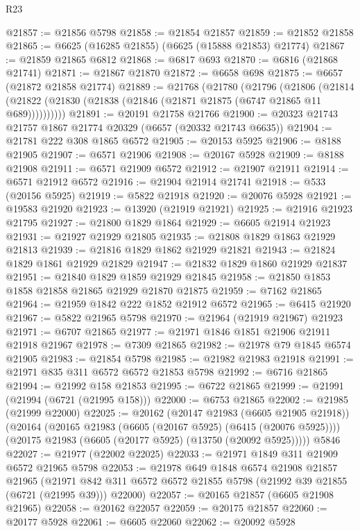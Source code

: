\begin{lexlean}{R23}
\begin{coremodule}
@21857 := @21856 @5798
@21858 := @21854 @21857
@21859 := @21852 @21858
@21865 := @6625 (@16285 @21855) (@6625 (@15888 @21853) @21774)
@21867 := @21859 @21865 @6812
@21868 := @6817 @693
@21870 := @6816 (@21868 @21741)
@21871 := @21867 @21870
@21872 := @6658 @698
@21875 := @6657 (@21872 @21858 @21774)
@21889 := @21768
    (@21780
      (@21796
        (@21806
          (@21814 (@21822 (@21830 (@21838 (@21846 (@21871 @21875 (@6747 @21865 @11 @689))))))))))
@21891 := @20191 @21758 @21766
@21900 := @20323 @21743 @21757 @1867 @21774 @20329 (@6657 (@20332 @21743 @6635))
@21904 := @21781 @222 @308 @1865 @6572
@21905 := @20153 @5925
@21906 := @8188 @21905
@21907 := @6571 @21906
@21908 := @20167 @5928
@21909 := @8188 @21908
@21911 := @6571 @21909 @6572
@21912 := @21907 @21911
@21914 := @6571 @21912 @6572
@21916 := @21904 @21914 @21741
@21918 := @533 (@20156 @5925)
@21919 := @5822 @21918
@21920 := @20076 @5928
@21921 := @19583 @21920
@21923 := @13920 (@21919 @21921)
@21925 := @21916 @21923 @21795
@21927 := @21800 @1829 @1864
@21929 := @6605 @21914 @21923
@21931 := @21927 @21929 @21805
@21935 := @21808 @1829 @1863 @21929 @21813
@21939 := @21816 @1829 @1862 @21929 @21821
@21943 := @21824 @1829 @1861 @21929 @21829
@21947 := @21832 @1829 @1860 @21929 @21837
@21951 := @21840 @1829 @1859 @21929 @21845
@21958 := @21850 @1853 @1858 @21858 @21865 @21929 @21870 @21875
@21959 := @7162 @21865
@21964 := @21959 @1842 @222 @1852 @21912 @6572
@21965 := @6415 @21920
@21967 := @5822 @21965 @5798
@21970 := @21964 (@21919 @21967) @21923
@21971 := @6707 @21865
@21977 := @21971 @1846 @1851 @21906 @21911 @21918 @21967
@21978 := @7309 @21865
@21982 := @21978 @79 @1845 @6574 @21905
@21983 := @21854 @5798
@21985 := @21982 @21983 @21918
@21991 := @21971 @835 @311 @6572 @6572 @21853 @5798
@21992 := @6716 @21865
@21994 := @21992 @158 @21853
@21995 := @6722 @21865
@21999 := @21991 (@21994 (@6721 (@21995 @158)))
@22000 := @6753 @21865
@22002 := @21985 (@21999 @22000)
@22025 := @20162
    (@20147 @21983 (@6605 @21905 @21918))
    (@20164
      (@20165 @21983 (@6605 (@20167 @5925) (@6415 (@20076 @5925))))
      (@20175 @21983 (@6605 (@20177 @5925) (@13750 (@20092 @5925)))))
    @5846
@22027 := @21977 (@22002 @22025)
@22033 := @21971 @1849 @311 @21909 @6572 @21965 @5798
@22053 := @21978
    @649
    @1848
    @6574
    @21908
    @21857
    @21965
    (@21971 @842 @311 @6572 @6572 @21855 @5798 (@21992 @39 @21855 (@6721 (@21995 @39))) @22000)
@22057 := @20165 @21857 (@6605 @21908 @21965)
@22058 := @20162 @22057
@22059 := @20175 @21857
@22060 := @20177 @5928
@22061 := @6605 @22060
@22062 := @20092 @5928

\end{coremodule}
\end{lexlean}
